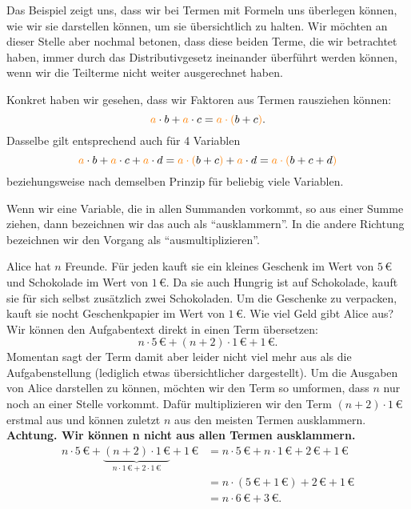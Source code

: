 \documentclass[../../main.tex]{subfiles}
\begin{document}
	Das Beispiel zeigt uns, dass wir bei Termen mit Formeln uns überlegen können, wie wir sie darstellen können, um sie übersichtlich
	zu halten. Wir möchten an dieser Stelle aber nochmal betonen, dass diese beiden Terme, die wir betrachtet haben, immer durch das
	Distributivgesetz ineinander überführt werden können, wenn wir die Teilterme nicht weiter ausgerechnet haben.

	Konkret haben wir gesehen, dass wir Faktoren aus Termen rausziehen können:
	\[{\color{orange}a}\cdot b + {\color{orange}a}\cdot c = {\color{orange}a\cdot (}b+c{\color{orange})}.\]
	Dasselbe gilt entsprechend auch für 4 Variablen
	\[{\color{orange}a}\cdot b + {\color{orange}a}\cdot c + {\color{orange}a}\cdot d = {\color{orange}a\cdot (}b+c{\color{orange})} + {\color{orange}a}\cdot d = {\color{orange}a\cdot (}b+c+d{\color{orange})}\]
	beziehungsweise nach demselben Prinzip für beliebig viele Variablen.

	Wenn wir eine Variable, die in allen Summanden vorkommt, so aus einer Summe ziehen, dann bezeichnen wir das auch als \enquote{ausklammern}.
	In die andere Richtung bezeichnen wir den Vorgang als \enquote{ausmultiplizieren}.

	\begin{example}{}
		Alice hat $n$ Freunde. Für jeden kauft sie ein kleines Geschenk im Wert von $5\,\euro{}$ und Schokolade im Wert von $1\,\euro{}$.
		Da sie auch Hungrig ist auf Schokolade, kauft sie für sich selbst zusätzlich zwei Schokoladen. Um die Geschenke zu verpacken, kauft sie
		nocht Geschenkpapier im Wert von $1\,\euro{}$. Wie viel Geld gibt Alice aus?\\[.5em]
		Wir können den Aufgabentext direkt in einen Term übersetzen:
		\[n\cdot 5\,\euro{}+(n+2)\cdot 1\,\euro{} + 1\,\euro{}.\]
		Momentan sagt der Term damit aber leider nicht viel mehr aus als die Aufgabenstellung (lediglich etwas übersichtlicher dargestellt).
		Um die Ausgaben von Alice darstellen zu können, möchten wir den Term so umformen, dass $n$ nur noch an einer Stelle vorkommt.
		Dafür multiplizieren wir den Term $(n+2)\cdot 1\,\euro{}$ erstmal aus und können zuletzt $n$ aus den meisten Termen ausklammern.
		\textbf{Achtung. Wir können n nicht aus allen Termen ausklammern.}
		\begin{align*}
			n\cdot 5\,\euro{} + \underbrace{(n+2)\cdot 1\,\euro{}}_{n\cdot 1\,\euro{}+2\cdot 1\,\euro{}} + 1\,\euro{} &= n\cdot 5\,\euro{}+n\cdot 1\,\euro{} + 2\,\euro{}+1\,\euro{}\\
			 &= n\cdot(5\,\euro{}+1\,\euro{})+2\,\euro{}+1\,\euro{}\\
			 &= n\cdot 6\,\euro{} + 3\,\euro{}.
		\end{align*}
	\end{example}
\end{document}
